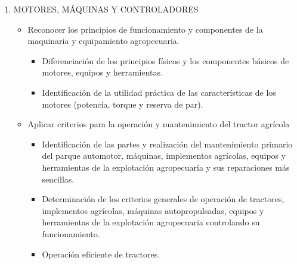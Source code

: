 \begin{enumerate}
    \item MOTORES, MÁQUINAS Y CONTROLADORES
    
    \begin{itemize}
        \item Reconocer los principios
de funcionamiento y componentes de la maquinaria y equipamiento agropecuaria. 
    \begin{itemize}
        \item Diferenciación de los principios físicos y los componentes
básicos de motores, equipos y herramientas.
\item Identificación de la utilidad práctica de las características
de los motores (potencia, torque y reserva de par).
    \end{itemize}
    \item Aplicar criterios para la operación y mantenimiento del tractor agrícola 
    \begin{itemize}
        \item Identificación de las partes y realización del
mantenimiento primario del parque automotor, máquinas,
implementos agrícolas, equipos y herramientas de la
explotación agropecuaria y sus reparaciones más
sencillas.
\item Determinación de los criterios generales de operación de
tractores, implementos agrícolas, máquinas
autopropulsadas, equipos y herramientas de la
explotación agropecuaria controlando su funcionamiento.
\item Operación eficiente de tractores. 


\end{itemize}
\end{itemize}
\end{enumerate}
